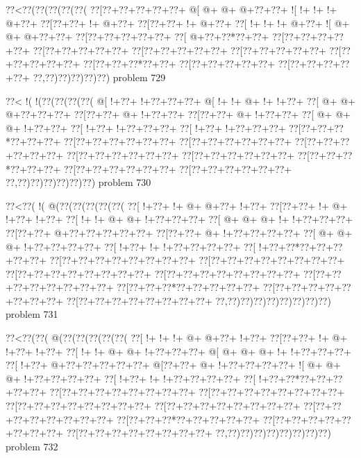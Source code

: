 \vbox{\vbox{\goo
\0??<\0??(\0??(\0??(\0??(\0??(
\0??[\0??+\0??+\0??+\0??+\0??+
\- @[\- @+\- @+\- @+\0??+\0??+
\- ![\- !+\- !+\- !+\- @+\0??+
\0??[\0??+\0??+\- !+\- @+\0??+
\0??[\0??+\0??+\- !+\- @+\0??+
\0??[\- !+\- !+\- !+\- @+\0??+
\- ![\- @+\- @+\- @+\0??+\0??+
\0??[\0??+\0??+\0??+\0??+\0??+
\0??[\- @+\0??+\0??*\0??+\0??+
\0??[\0??+\0??+\0??+\0??+\0??+
\0??[\0??+\0??+\0??+\0??+\0??+
\0??[\0??+\0??+\0??+\0??+\0??+
\0??[\0??+\0??+\0??+\0??+\0??+
\0??[\0??+\0??+\0??+\0??+\0??+
\0??[\0??+\0??+\0??*\0??+\0??+
\0??[\0??+\0??+\0??+\0??+\0??+
\0??[\0??+\0??+\0??+\0??+\0??+
\0??,\0??)\0??)\0??)\0??)\0??)
}
\hfil problem 729\hfil\break
}

\vbox{\vbox{\goo
\0??<\- !(\- !(\0??(\0??(\0??(\0??(
\- @[\- !+\0??+\- !+\0??+\0??+\0??+
\- @[\- !+\- !+\- @+\- !+\- !+\0??+
\0??[\- @+\- @+\- @+\0??+\0??+\0??+
\0??[\0??+\0??+\- @+\- !+\0??+\0??+
\0??[\0??+\0??+\- @+\- !+\0??+\0??+
\0??[\- @+\- @+\- @+\- !+\0??+\0??+
\0??[\- !+\0??+\- !+\0??+\0??+\0??+
\0??[\- !+\0??+\- !+\0??+\0??+\0??+
\0??[\0??+\0??+\0??*\0??+\0??+\0??+
\0??[\0??+\0??+\0??+\0??+\0??+\0??+
\0??[\0??+\0??+\0??+\0??+\0??+\0??+
\0??[\0??+\0??+\0??+\0??+\0??+\0??+
\0??[\0??+\0??+\0??+\0??+\0??+\0??+
\0??[\0??+\0??+\0??+\0??+\0??+\0??+
\0??[\0??+\0??+\0??*\0??+\0??+\0??+
\0??[\0??+\0??+\0??+\0??+\0??+\0??+
\0??[\0??+\0??+\0??+\0??+\0??+\0??+
\0??,\0??)\0??)\0??)\0??)\0??)\0??)
}
\hfil problem 730\hfil\break
}

\vbox{\vbox{\goo
\0??<\0??(\- !(\- @(\0??(\0??(\0??(\0??(\0??(
\0??[\- !+\0??+\- !+\- @+\- @+\0??+\- !+\0??+
\0??[\0??+\0??+\- !+\- @+\- !+\0??+\- !+\0??+
\0??[\- !+\- !+\- @+\- @+\- !+\0??+\0??+\0??+
\0??[\- @+\- @+\- @+\- !+\- !+\0??+\0??+\0??+
\0??[\0??+\0??+\- @+\0??+\0??+\0??+\0??+\0??+
\0??[\0??+\0??+\- @+\- !+\0??+\0??+\0??+\0??+
\0??[\- @+\- @+\- @+\- !+\0??+\0??+\0??+\0??+
\0??[\- !+\0??+\- !+\- !+\0??+\0??+\0??+\0??+
\0??[\- !+\0??+\0??*\0??+\0??+\0??+\0??+\0??+
\0??[\0??+\0??+\0??+\0??+\0??+\0??+\0??+\0??+
\0??[\0??+\0??+\0??+\0??+\0??+\0??+\0??+\0??+
\0??[\0??+\0??+\0??+\0??+\0??+\0??+\0??+\0??+
\0??[\0??+\0??+\0??+\0??+\0??+\0??+\0??+\0??+
\0??[\0??+\0??+\0??+\0??+\0??+\0??+\0??+\0??+
\0??[\0??+\0??+\0??*\0??+\0??+\0??+\0??+\0??+
\0??[\0??+\0??+\0??+\0??+\0??+\0??+\0??+\0??+
\0??[\0??+\0??+\0??+\0??+\0??+\0??+\0??+\0??+
\0??,\0??)\0??)\0??)\0??)\0??)\0??)\0??)\0??)
}
\hfil problem 731\hfil\break
}

\vbox{\vbox{\goo
\0??<\0??(\0??(\- @(\0??(\0??(\0??(\0??(\0??(
\0??[\- !+\- !+\- !+\- @+\- @+\0??+\- !+\0??+
\0??[\0??+\0??+\- !+\- @+\- !+\0??+\- !+\0??+
\0??[\- !+\- !+\- @+\- @+\- !+\0??+\0??+\0??+
\- @[\- @+\- @+\- @+\- !+\- !+\0??+\0??+\0??+
\0??[\- !+\0??+\- @+\0??+\0??+\0??+\0??+\0??+
\- @[\0??+\0??+\- @+\- !+\0??+\0??+\0??+\0??+
\- ![\- @+\- @+\- @+\- !+\0??+\0??+\0??+\0??+
\0??[\- !+\0??+\- !+\- !+\0??+\0??+\0??+\0??+
\0??[\- !+\0??+\0??*\0??+\0??+\0??+\0??+\0??+
\0??[\0??+\0??+\0??+\0??+\0??+\0??+\0??+\0??+
\0??[\0??+\0??+\0??+\0??+\0??+\0??+\0??+\0??+
\0??[\0??+\0??+\0??+\0??+\0??+\0??+\0??+\0??+
\0??[\0??+\0??+\0??+\0??+\0??+\0??+\0??+\0??+
\0??[\0??+\0??+\0??+\0??+\0??+\0??+\0??+\0??+
\0??[\0??+\0??+\0??*\0??+\0??+\0??+\0??+\0??+
\0??[\0??+\0??+\0??+\0??+\0??+\0??+\0??+\0??+
\0??[\0??+\0??+\0??+\0??+\0??+\0??+\0??+\0??+
\0??,\0??)\0??)\0??)\0??)\0??)\0??)\0??)\0??)
}
\hfil problem 732\hfil\break
}

